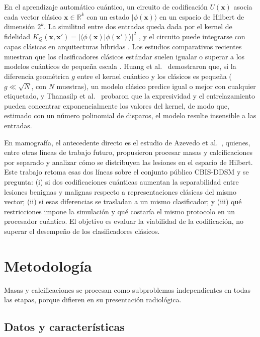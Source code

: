 \documentclass[conference,letterpaper]{IEEEtran}
\begin{document}
En el aprendizaje automático cuántico, un circuito de codificación $U(\mathbf{x})$ asocia cada vector clásico $\mathbf{x} \in \mathbb{R}^k$ con un estado $|\phi(\mathbf{x})\rangle$ en un espacio de Hilbert de dimensión $2^k$. La similitud entre dos entradas queda dada por el kernel de fidelidad $K_Q(\mathbf{x},\mathbf{x}') = |\langle\phi(\mathbf{x})|\phi(\mathbf{x}')\rangle|^2$ \cite{havlicek2019supervised, schuld2019quantum}, y el circuito puede integrarse con capas clásicas en arquitecturas híbridas \cite{Mari2020Transfer}. Los estudios comparativos recientes muestran que los clasificadores clásicos estándar suelen igualar o superar a los modelos cuánticos de pequeña escala \cite{Bowles2024Benchmarking}. Huang et al.~\cite{huang2021power} demostraron que, si la diferencia geométrica $g$ entre el kernel cuántico y los clásicos es pequeña ($g \ll \sqrt{N}$, con $N$ muestras), un modelo clásico predice igual o mejor con cualquier etiquetado, y Thanasilp et al.~\cite{Thanasilp2024} probaron que la expresividad y el entrelazamiento pueden concentrar exponencialmente los valores del kernel, de modo que, estimado con un número polinomial de disparos, el modelo resulte insensible a las entradas.

En mamografía, el antecedente directo es el estudio de Azevedo et al.~\cite{Azevedo2022QuantumTransfer}, quienes, entre otras líneas de trabajo futuro, propusieron procesar masas y calcificaciones por separado y analizar cómo se distribuyen las lesiones en el espacio de Hilbert. Este trabajo retoma esas dos líneas sobre el conjunto público CBIS-DDSM \cite{Lee2017CBISDDSM} y se pregunta: (i) si dos codificaciones cuánticas aumentan la separabilidad entre lesiones benignas y malignas respecto a representaciones clásicas del mismo vector; (ii) si esas diferencias se trasladan a un mismo clasificador; y (iii) qué restricciones impone la simulación y qué costaría el mismo protocolo en un procesador cuántico. El objetivo es evaluar la viabilidad de la codificación, no superar el desempeño de los clasificadores clásicos.

\section{Metodología}

Masas y calcificaciones se procesan como subproblemas independientes en todas las etapas, porque difieren en su presentación radiológica.

\subsection{Datos y características}
\end{document}
